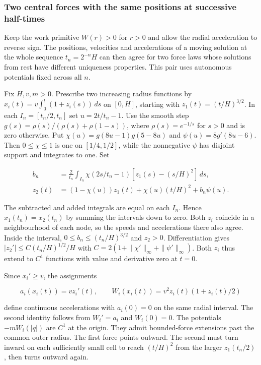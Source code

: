 \documentclass[11pt,a4paper]{article}
\begin{document}
\subsubsection{Two central forces with the same positions at successive
half-times}\label{two-central-forces-with-the-same-positions-at-successive-half-times}

Keep the work primitive \(W(r)>0\) for \(r>0\) and allow the radial
acceleration to reverse sign. The positions, velocities and
accelerations of a moving solution at the whole sequence \(t_n=2^{-n}H\)
can then agree for two force laws whose solutions from rest have
different uniqueness properties. This pair uses autonomous potentials
fixed across all \(n\).

Fix \(H,v,m>0\). Prescribe two increasing radius functions by
\(x_i(t)=v\int_0^t(1+z_i(s))\,ds\) on \([0,H]\), starting with
\(z_1(t)=(t/H)^{3/2}\). In each \(I_n=[t_n/2,t_n]\) set \(u=2t/t_n-1\).
Use the smooth step \(g(s)=\rho(s)/(\rho(s)+\rho(1-s))\), where
\(\rho(s)=e^{-1/s}\) for \(s>0\) and is zero otherwise. Put
\(\chi(u)=g(8u-1)g(5-8u)\) and \(\psi(u)=8g'(8u-6)\). Then
\(0\le\chi\le1\) is one on \([1/4,1/2]\), while the nonnegative \(\psi\)
has disjoint support and integrates to one. Set

\[
 \begin{split}
 b_n&=\frac{2}{t_n}\int_{I_n}\chi(2s/t_n-1)
                     [z_1(s)-(s/H)^2]\,ds,\\
 z_2(t)&=(1-\chi(u))z_1(t)+\chi(u)(t/H)^2+b_n\psi(u).
 \end{split} \tag{D4}
\]

The subtracted and added integrals are equal on each \(I_n\). Hence
\(x_1(t_n)=x_2(t_n)\) by summing the intervals down to zero. Both
\(z_i\) coincide in a neighbourhood of each node, so the speeds and
accelerations there also agree. Inside the interval,
\(0\le b_n\le(t_n/H)^{3/2}\) and \(z_2>0\). Differentiation gives
\(|z_2'|\le C(t_n/H)^{1/2}/H\) with
\(C=2(1+\|\chi'\|_\infty+\|\psi'\|_\infty)\). Both \(z_i\) thus extend
to \(C^1\) functions with value and derivative zero at \(t=0\).

Since \(x_i'\ge v\), the assignments

\[
   a_i(x_i(t))=v z_i'(t),\qquad
   W_i(x_i(t))=v^2 z_i(t)(1+z_i(t)/2)
\]

define continuous accelerations with \(a_i(0)=0\) on the same radial
interval. The second identity follows from \(W_i'=a_i\) and
\(W_i(0)=0\). The potentials \(-mW_i(|q|)\) are \(C^1\) at the origin.
They admit bounded-force extensions past the common outer radius. The
first force points outward. The second must turn inward on each
sufficiently small cell to reach \((t/H)^2\) from the larger
\(z_1(t_n/2)\), then turns outward again.
\end{document}
